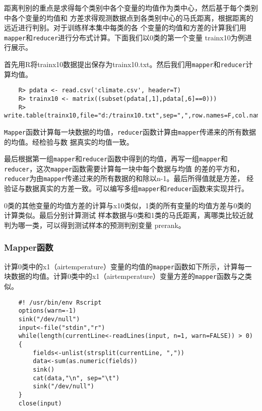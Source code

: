 距离判别的重点是求得每个类别中各个变量的均值作为类中心，然后基于每个类别中各个变量的均值和
方差求得观测数据点到各类别中心的马氏距离，根据距离的远近进行判别。对于训练样本集中每类的各
个变量的均值和方差的计算我们用\lstinline!mapper!和\lstinline!reducer!进行分布式计算。下面我们以0类的第一个变量
trainx10为例进行展示。

首先用R将trainx10数据提出保存为trainx10.txt。然后我们用\lstinline!mapper!和\lstinline!reducer!计算均值。

\begin{lstlisting}
	R> pdata <- read.csv('climate.csv', header=T)
	R> trainx10 <- matrix((subset(pdata[,1],pdata[,6]==0)))
	R> write.table(trainx10,file="d:/trainx10.txt",sep=",",row.names=F,col.names=F)
\end{lstlisting}

\lstinline|Mapper|函数计算每一块数据的均值，\lstinline!reducer!函数计算由\lstinline!mapper!传递来的所有数据的均值。经检验与数
据真实的均值一致。

最后根据第一组\lstinline|mapper|和\lstinline|reducer|函数中得到的均值，再写一组\lstinline!mapper!和\lstinline!reducer!，这次\lstinline!mapper!函数需要计算每一块中每个数据与均值
的差的平方和，\lstinline!reducer!为由\lstinline!mapper!传递过来的所有数据的和除以n-1。最后所得值就是方差，
经验证与数据真实的方差一致。可以编写多组\lstinline|mapper|和\lstinline|reducer|函数来实现并行。

0类的其他变量的均值方差的计算与x10类似，1类的所有变量的均值方差与0类的计算类似。最后分别计算测试
样本数据与0类和1类的马氏距离，离哪类比较近就判为哪一类，可以得到测试样本的预测判别变量
prerank。

\subsubsection{Mapper函数}\label{mapperux51fdux6570}

计算0类中的x1（airtemperature）变量的均值的\lstinline!mapper!函数如下所示，计算每一块数据的均值。计算0类中的x1（airtemperature）变量方差的\lstinline!mapper!函数与之类似。

\begin{lstlisting}
	#! /usr/bin/env Rscript
	options(warn=-1)
	sink("/dev/null")
	input<-file("stdin","r")
	while(length(currentLine<-readLines(input, n=1, warn=FALSE)) > 0)
	{
	    fields<-unlist(strsplit(currentLine, ","))
	    data<-sum(as.numeric(fields))
	    sink()
	    cat(data,"\n", sep="\t")
	    sink("/dev/null")
	}
	close(input)
\end{lstlisting}

